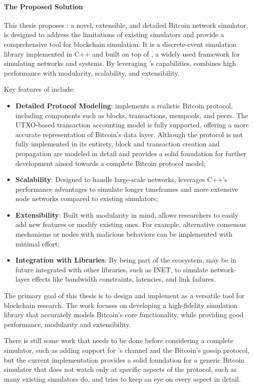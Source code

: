 \paragraph{The Proposed Solution}\label{par:intro-solution}

This thesis proposes \iblock{}: a novel, extensible, and detailed Bitcoin
network simulator. \iblock{} is designed to address the limitations of existing
simulators and provide a comprehensive tool for blockchain simulation. It is a
discrete-event simulation library implemented in C++ and built on top of
\omnetpp{}, a widely used framework for simulating networks and systems. By
leveraging \omnetpp{}'s capabilities, \iblock{} combines high performance with
modularity, scalability, and extensibility.

Key features of \iblock{} include:
\begin{itemize}
	\item \textbf{Detailed Protocol Modeling}: \iblock{} implements a
		realistic Bitcoin protocol, including components such as
		blocks, transactions, mempools, and peers. The UTXO-based
		transaction accounting model is fully supported, offering a
		more accurate representation of Bitcoin's data layer. Although
		the protocol is not fully implemented in its entirety, block
		and transaction creation and propagation are modeled in detail
		and \iblock{} provides a solid foundation for further
		development aimed towards a complete Bitcoin protocol model;
	\item \textbf{Scalability}: Designed to handle large-scale networks,
		\iblock{} leverages C++'s performance advantages to simulate
		longer timeframes and more extensive node networks compared to
		existing simulators;
	\item \textbf{Extensibility}: Built with modularity in mind, \iblock{}
		allows researchers to easily add new features or modify
		existing ones. For example, alternative consensus mechanisms or
		nodes with malicious behaviors can be implemented with minimal
		effort;
	\item \textbf{Integration with \omnetpp{} Libraries}: By being part of
		the \omnetpp{} ecosystem, \iblock{} may be in future integrated
		with other libraries, such as INET, to simulate network-layer
		effects like bandwidth constraints, latencies, and link
		failures.
\end{itemize}

The primary goal of this thesis is to design and implement \iblock{} as a
versatile tool for blockchain research. The work focuses on developing a
high-fidelity simulation library that accurately models Bitcoin's core
functionality, while providing good performance, modularity and extensibility.

There is still some work that needs to be done before considering \iblock{} a
complete simulator, such as adding support for \omnetpp{}'s channel and the
Bitcoin's gossip protocol, but the current implementation provides a solid
foundation for a generic Bitcoin simulator that does not watch only at specific
aspects of the protocol, such as many existing simulators do, and tries to keep
an eye on every aspect in detail.


